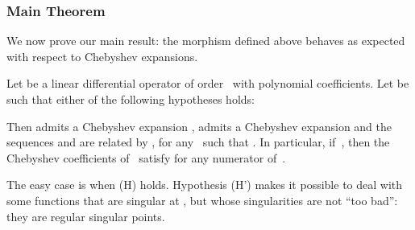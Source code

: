 \documentclass{amsart}
\theoremstyle{definition}
\begin{document}
\subsubsection{Main Theorem}
We now prove our main result: the morphism defined above behaves as expected with respect to Chebyshev expansions.
\begin{theo}\label{main}
Let  be a linear differential operator of order~ with polynomial coefficients. Let 
be such that either of the following hypotheses holds:

Then  admits a Chebyshev expansion ,
 admits a Chebyshev expansion  and the sequences  and  are related by , for any~ such that . In particular, if~, then the Chebyshev coefficients of~ satisfy  for any numerator of~.
\end{theo}
The easy case is when (H) holds. Hypothesis (H') makes it possible to deal with some functions that are singular at , but whose singularities are not ``too bad'': they are regular singular points. 
\end{document}
